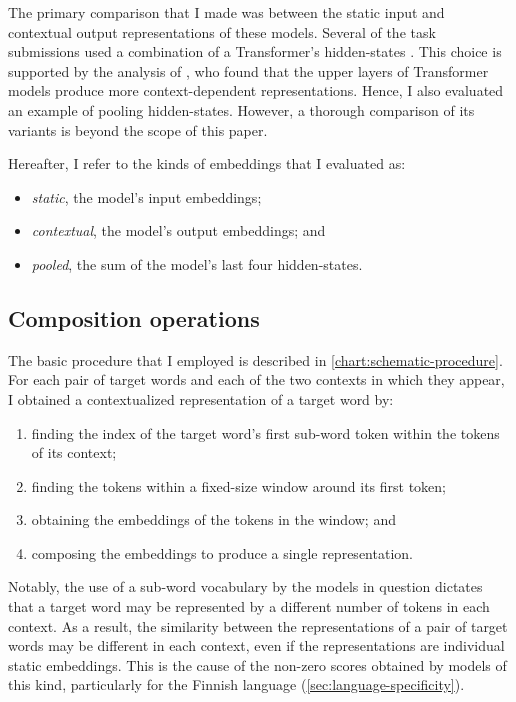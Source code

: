 The primary comparison that I made was between the static input and contextual output
representations of these models.
Several of the task submissions used a combination of a Transformer's hidden-states
\parencites[e.g.][276]{Gamallo2020}[61]{CostellaPessutto2020}[145]{Hettiarachchi2020}.
This choice is supported by the analysis of \textcites{Ethayarajh2019}, who found that
the upper layers of Transformer models produce more context-dependent representations.
Hence, I also evaluated an example of pooling hidden-states.
However, a thorough comparison of its variants is beyond the scope of this paper.
\begin{samepage}
  Hereafter, I refer to the kinds of embeddings that I evaluated as:
  \begin{itemize}
    \item \emph{static}, the model's input embeddings;
    \item \emph{contextual}, the model's output embeddings; and
    \item \emph{pooled}, the sum of the model's last four hidden-states.
  \end{itemize}
\end{samepage}

\subsection{Composition operations}
\label{sec:composition-operations}

The basic procedure that I employed is described in \cref{chart:schematic-procedure}.
For each pair of target words and each of the two contexts in which they appear, I
obtained a contextualized representation of a target word by:
\begin{enumerate}
  \item finding the index of the target word's first sub-word token within the tokens of its context;
  \item finding the tokens within a fixed-size window around its first token;
  \item obtaining the embeddings of the tokens in the window; and
  \item composing the embeddings to produce a single representation.
\end{enumerate}
Notably, the use of a sub-word vocabulary by the models in question
\parencites[e.g.][4174]{Devlin2019} dictates that a target word may be represented by a
different number of tokens in each context.
As a result, the similarity between the representations of a pair of target words may
be different in each context, even if the representations are individual static
embeddings.
This is the cause of the non-zero scores obtained by models of this kind, particularly
for the Finnish language (\cref{sec:language-specificity}).

